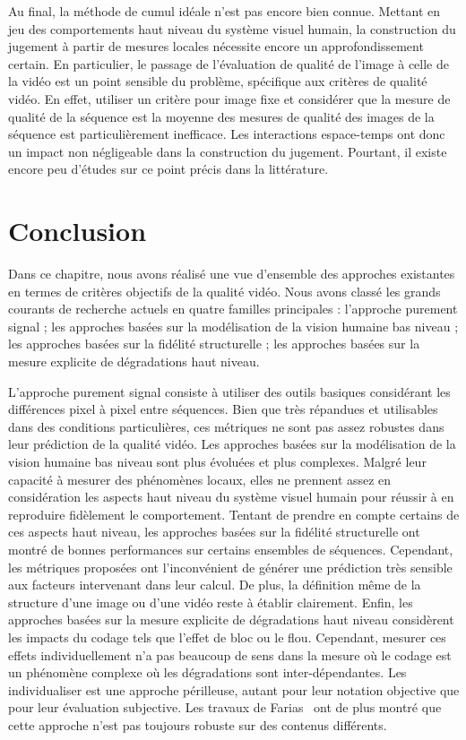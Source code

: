 Au final, la méthode de cumul idéale n'est pas encore bien connue. Mettant en jeu des comportements haut niveau du système visuel humain, la construction du jugement à partir de mesures locales nécessite encore un approfondissement certain. En particulier, le passage de l'évaluation de qualité de l'image à celle de la vidéo est un point sensible du problème, spécifique aux critères de qualité vidéo. En effet, utiliser un critère pour image fixe et considérer que la mesure de qualité de la séquence est la moyenne des mesures de qualité des images de la séquence est particulièrement inefficace. Les interactions espace-temps ont donc un impact non négligeable dans la construction du jugement. Pourtant, il existe encore peu d'études sur ce point précis dans la littérature.


\section{Conclusion}
Dans ce chapitre, nous avons réalisé une vue d'ensemble des approches existantes en termes de critères objectifs de la qualité vidéo. Nous avons classé les grands courants de recherche actuels en quatre familles principales : l'approche purement signal ; les approches basées sur la modélisation de la vision humaine bas niveau ; les approches basées sur la fidélité structurelle ; les approches basées sur la mesure explicite de dégradations haut niveau.

L'approche purement signal consiste à utiliser des outils basiques considérant les différences pixel à pixel entre séquences. Bien que très répandues et utilisables dans des conditions particulières, ces métriques ne sont pas assez robustes dans leur prédiction de la qualité vidéo. Les approches basées sur la modélisation de la vision humaine bas niveau sont plus évoluées et plus complexes. Malgré leur capacité à mesurer des phénomènes locaux, elles ne prennent assez en considération les aspects haut niveau du système visuel humain pour réussir à en reproduire fidèlement le comportement. Tentant de prendre en compte certains de ces aspects haut niveau, les approches basées sur la fidélité structurelle ont montré de bonnes performances sur certains ensembles de séquences. Cependant, les métriques proposées ont l'inconvénient de générer une prédiction très sensible aux facteurs intervenant dans leur calcul. De plus, la définition même de la structure d'une image ou d'une vidéo reste à établir clairement. Enfin, les approches basées sur la mesure explicite de dégradations haut niveau considèrent les impacts du codage tels que l'effet de bloc ou le flou. Cependant, mesurer ces effets individuellement n'a pas beaucoup de sens dans la mesure où le codage est un phénomène complexe où les dégradations sont inter-dépendantes. Les individualiser est une approche périlleuse, autant pour leur notation objective que pour leur évaluation subjective. Les travaux de Farias~\cite{farias-phd} ont de plus montré que cette approche n'est pas toujours robuste sur des contenus différents.

